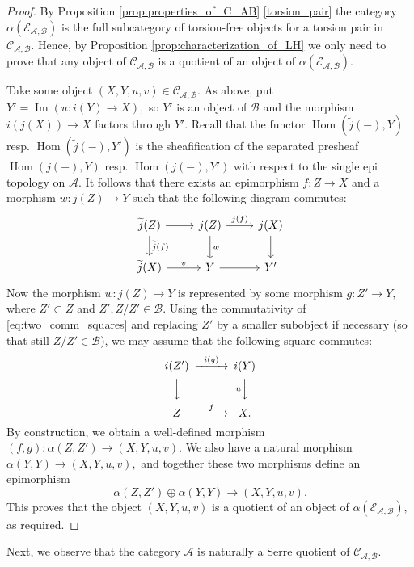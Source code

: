\documentclass[11pt,leqno]{amsart}
\numberwithin{equation}{section}
\def\wt{\widetilde}
\def\Hom{\operatorname{Hom}}
\newcommand{\cA}{{\mathcal A}}
\newcommand{\cB}{{\mathcal B}}
\newcommand{\cC}{{\mathcal C}}
\newcommand{\cE}{{\mathcal E}}
\newcommand{\im}{\operatorname{Im}}
\begin{document}
\begin{proof}
By Proposition \ref{prop:properties_of_C_AB} \ref{torsion_pair} the category $\alpha(\cE_{\cA,\cB})$ is the full subcategory of torsion-free objects for a torsion pair in $\cC_{\cA,\cB}.$ Hence, by Proposition \ref{prop:characterization_of_LH} we only need to prove that any object of $\cC_{\cA,\cB}$ is a quotient of an object of $\alpha(\cE_{\cA,\cB}).$

Take some object $(X,Y,u,v)\in\cC_{\cA,\cB}.$ As above, put $Y'=\im(u:i(Y)\to X),$ so $Y'$ is an object of $\cB$ and the morphism $i(j(X))\to X$ factors through $Y'.$  Recall that the functor $\Hom(\wt{j}(-),Y)$ resp. $\Hom(\wt{j}(-),Y')$ is the sheafification of the separated presheaf $\Hom(j(-),Y)$ resp. $\Hom(j(-),Y')$ with respect to the single epi topology on $\cA.$ It follows that there exists an epimorphism $f:Z\to X$ and a morphism $w:j(Z)\to Y$ such that the following diagram commutes:
\begin{equation}\label{eq:two_comm_squares}
\begin{tikzcd}
\wt{j}(Z) \ar[d, "\wt{j}(f)"] \ar[r] & j(Z) \ar[d, "w"] \ar[r, "j(f)"] & j(X)\ar[d] \\
\wt{j}(X)\ar[r, "v"]   & Y \ar[r] & Y'
\end{tikzcd}
\end{equation}
Now the morphism $w:j(Z)\to Y$ is represented by some morphism $g:Z'\to Y,$ where $Z'\subset Z$ and $Z',Z/Z'\in\cB.$ Using the commutativity of \eqref{eq:two_comm_squares} and replacing $Z'$ by a smaller subobject if necessary (so that still $Z/Z'\in\cB$), we may assume that the following square commutes:
\begin{equation*}
\begin{CD}
i(Z') @>{i(g)}>> i(Y)\\
@VVV @V{u}VV\\
Z @>{f}>> X.
\end{CD}
\end{equation*}
By construction, we obtain a well-defined morphism $(f,g):\alpha(Z,Z')\to (X,Y,u,v).$ We also have a natural morphism $\alpha(Y,Y)\to (X,Y,u,v),$ and together these two morphisms define an epimorphism
\begin{equation*}
\alpha(Z,Z')\oplus\alpha(Y,Y)\to (X,Y,u,v).
\end{equation*}
This proves that the object $(X,Y,u,v)$ is a quotient of an object of $\alpha(\cE_{\cA,\cB}),$ as required. 
\end{proof}

Next, we observe that the category $\cA$ is naturally a Serre quotient of $\cC_{\cA,\cB}.$
\end{document}
